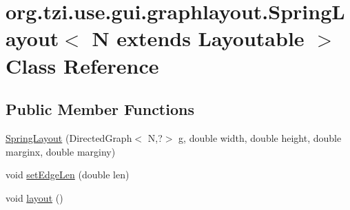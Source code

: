 \hypertarget{classorg_1_1tzi_1_1use_1_1gui_1_1graphlayout_1_1_spring_layout_3_01_n_01extends_01_layoutable_01_4}{\section{org.\-tzi.\-use.\-gui.\-graphlayout.\-Spring\-Layout$<$ N extends Layoutable $>$ Class Reference}
\label{classorg_1_1tzi_1_1use_1_1gui_1_1graphlayout_1_1_spring_layout_3_01_n_01extends_01_layoutable_01_4}
}
\subsection*{Public Member Functions}
\begin{DoxyCompactItemize}
\item 
\hyperlink{classorg_1_1tzi_1_1use_1_1gui_1_1graphlayout_1_1_spring_layout_3_01_n_01extends_01_layoutable_01_4_aa055704dce4581ee8c557edf5ba44dce}{Spring\-Layout} (Directed\-Graph$<$ N,?$>$ g, double width, double height, double marginx, double marginy)
\item 
void \hyperlink{classorg_1_1tzi_1_1use_1_1gui_1_1graphlayout_1_1_spring_layout_3_01_n_01extends_01_layoutable_01_4_a0b74b891784ec951cb6817b134bfe7f3}{set\-Edge\-Len} (double len)
\item 
void \hyperlink{classorg_1_1tzi_1_1use_1_1gui_1_1graphlayout_1_1_spring_layout_3_01_n_01extends_01_layoutable_01_4_add7ea2c1141a105f416385e20a191fe7}{layout} ()
\end{DoxyCompactItemize}
